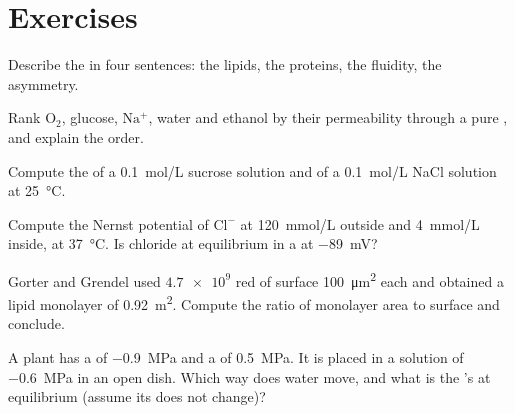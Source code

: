 \section{Exercises}

\begin{exercise}[$\star$]\label{exo:b1:membranes-transport:1}
Describe the  in four sentences: the lipids, the
proteins, the fluidity, the asymmetry.
\end{exercise}

\begin{exercise}[$\star$]\label{exo:b1:membranes-transport:2}
Rank $\mathrm{O_2}$, glucose, $\mathrm{Na^+}$, water and ethanol by
their permeability through a pure , and explain the order.
\end{exercise}

\begin{exercise}[$\star$]\label{exo:b1:membranes-transport:3}
Compute the  of a \qty{0.1}{mol/L} sucrose solution
and of a \qty{0.1}{mol/L} NaCl solution at \qty{25}{\celsius}.
\end{exercise}

\begin{exercise}[$\star$]\label{exo:b1:membranes-transport:4}
Compute the Nernst potential of $\mathrm{Cl^-}$ at \qty{120}{mmol/L}
outside and \qty{4}{mmol/L} inside, at \qty{37}{\celsius}. Is chloride
at equilibrium in a  at \qty{-89}{mV}?
\end{exercise}

\begin{exercise}[$\star\star$]\label{exo:b1:membranes-transport:5}
Gorter and Grendel used $\num{4.7e9}$ red  of surface
\qty{100}{\micro m^2} each and obtained a lipid monolayer of
\qty{0.92}{m^2}. Compute the ratio of monolayer area to  surface
and conclude.
\end{exercise}

\begin{exercise}[$\star\star$]\label{exo:b1:membranes-transport:6}
A plant  has a  of \qty{-0.9}{MPa} and a  of \qty{0.5}{MPa}. It is placed in a solution of  \qty{-0.6}{MPa} in an open dish. Which way does water move,
and what is the 's  at equilibrium (assume its
 does not change)?
\end{exercise}

